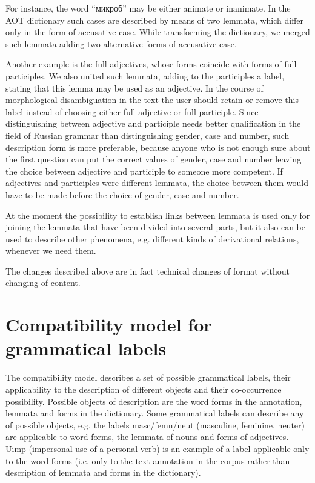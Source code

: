 \documentclass[a4paper]{article}
\begin{document}
For instance, the word ``микроб'' may be either animate or inanimate. In the AOT dictionary such cases are described by means of two lemmata, which differ only in the form of accusative case. While transforming the dictionary, we merged such lemmata adding two alternative forms of accusative case.

Another example is the full adjectives, whose forms coincide with forms of full participles. We also united such lemmata, adding to the participles a label, stating that this lemma may be used as an adjective. In the course of morphological disambiguation in the text the user should retain or remove this label instead of choosing either full adjective or full participle. Since distinguishing between adjective and participle needs better qualification in the field of Russian grammar than distinguishing gender, case and number, such description form is more preferable, because anyone who is not enough sure about the first question can put the correct values of gender, case and number leaving the choice between adjective and participle to someone more competent. If adjectives and participles were different lemmata, the choice between them would have to be made before the choice of gender, case and number.

At the moment the possibility to establish links between lemmata is used only for joining the lemmata that have been divided into several parts, but it also can be used to describe other phenomena, e.g. different kinds of derivational relations, whenever we need them.

The changes described above are in fact technical changes of format without changing of content.
\section{Compatibility model for grammatical labels}
The compatibility model describes a set of possible grammatical labels, their applicability to the description of different objects and their co-occurrence possibility. Possible objects of description are the word forms in the annotation, lemmata and forms in the dictionary. Some grammatical labels can describe any of possible objects, e.g. the labels masc/femn/neut (masculine, feminine, neuter) are applicable to word forms, the lemmata of nouns and forms of adjectives. Uimp (impersonal use of a personal verb) is an example of a label applicable only to the word forms (i.e. only to the text annotation in the corpus rather than description of lemmata and forms in the dictionary).
\end{document}
